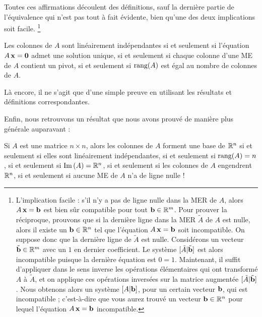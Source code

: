 Toutes ces affirmations découlent des définitions, sauf la dernière partie de l'équivalence qui n'est pas tout à fait évidente, bien qu'une des deux implications soit facile. \footnote{\label{nzrinrref}L'implication facile : s'il n'y a pas de ligne nulle dans la MER de $A$, alors $A\,\mathbf{x}=\mathbf{b}$ est bien sûr compatible pour tout $\mathbf{b}\in \mathbb{R}^m$.
Pour prouver la r\'eciproque, prouvons que si la dernière ligne dans la MER $\tilde A$ de $A$ est nulle, alors il existe un $\mathbf{b}\in \mathbb{R}^n$ tel que l'équation $A\,\mathbf{x}=\mathbf{b}$ soit incompatible. On suppose donc que la dernière ligne de $\tilde A$ est nulle. Considérons un vecteur $\tilde {\mathbf{b}} \in \mathbb{R}^m$ avec un $1$ en dernier coefficient. Le système $[ \tilde A | \tilde {\mathbf{b}}]$ est alors incompatible puisque la dernière équation est $0=1$. Maintenant, il suffit d'appliquer dans le sens inverse les opérations élémentaires qui ont transformé $A$ à $\tilde A$, et on applique ces opérations inversées sur la matrice augmentée $[ \tilde A | \tilde {\mathbf{b}}]$. Nous obtenons alors un système $[ A | \mathbf{b}]$, pour un certain vecteur $\mathbf{b}$, qui est incompatible ; c'est-à-dire que vous aurez trouvé un vecteur $\mathbf{b}\in \mathbb{R}^n$ pour lequel l'équation $A\,\mathbf{x}=\mathbf{b}$ incompatible. }

\begin{fac} Les colonnes de $A$ sont linéairement indépendantes si et seulement si
l'équation $A\,\mathbf{x}=\mathbf{0}$ admet une solution unique, si et seulement si chaque colonne d'une ME de $A$ contient un pivot, si et seulement si $\textrm{rang}(A)$ est égal au nombre de colonnes de $A$.\end{fac}

Là encore, il ne s'agit que d'une simple preuve en utilisant les r\'esultats et d\'efinitions correspondantes.

Enfin, nous retrouvons un r\'esultat que nous avons prouvé de manière plus générale auparavant :

\begin{fac} Si $A$ est une matrice $n\times n$, alors les colonnes de $A$ forment
une base de $\mathbb{R}^n$ si et seulement si elles sont linéairement indépendantes, si
et seulement si $\textrm{rang}(A)=n$, si et seulement si $\operatorname{Im}\,(A)=\mathbb{R}^n$, si et seulement
si les colonnes de $A$ engendrent $\mathbb{R}^n$, si et seulement si aucune ME de $A$ n'a de ligne nulle ! \end{fac}



